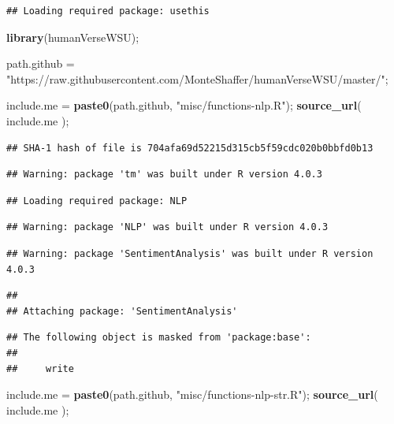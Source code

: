 \documentclass[]{article}
\newenvironment{Shaded}{\begin{snugshade}}{\end{snugshade}}
\newcommand{\KeywordTok}[1]{\textcolor[rgb]{0.13,0.29,0.53}{\textbf{#1}}}
\newcommand{\NormalTok}[1]{#1}
\newcommand{\StringTok}[1]{\textcolor[rgb]{0.31,0.60,0.02}{#1}}
\begin{document}
\begin{verbatim}
## Loading required package: usethis
\end{verbatim}

\begin{Shaded}
\begin{Highlighting}[]
\KeywordTok{library}\NormalTok{(humanVerseWSU);}

\NormalTok{path.github =}\StringTok{ "https://raw.githubusercontent.com/MonteShaffer/humanVerseWSU/master/"}\NormalTok{;}

\NormalTok{include.me =}\StringTok{ }\KeywordTok{paste0}\NormalTok{(path.github, }\StringTok{"misc/functions{-}nlp.R"}\NormalTok{);}
\KeywordTok{source\_url}\NormalTok{( include.me );}
\end{Highlighting}
\end{Shaded}

\begin{verbatim}
## SHA-1 hash of file is 704afa69d52215d315cb5f59cdc020b0bbfd0b13
\end{verbatim}

\begin{verbatim}
## Warning: package 'tm' was built under R version 4.0.3
\end{verbatim}

\begin{verbatim}
## Loading required package: NLP
\end{verbatim}

\begin{verbatim}
## Warning: package 'NLP' was built under R version 4.0.3
\end{verbatim}

\begin{verbatim}
## Warning: package 'SentimentAnalysis' was built under R version 4.0.3
\end{verbatim}

\begin{verbatim}
## 
## Attaching package: 'SentimentAnalysis'
\end{verbatim}

\begin{verbatim}
## The following object is masked from 'package:base':
## 
##     write
\end{verbatim}

\begin{Shaded}
\begin{Highlighting}[]
\NormalTok{include.me =}\StringTok{ }\KeywordTok{paste0}\NormalTok{(path.github, }\StringTok{"misc/functions{-}nlp{-}str.R"}\NormalTok{);}
\KeywordTok{source\_url}\NormalTok{( include.me );}
\end{Highlighting}
\end{Shaded}
\end{document}
